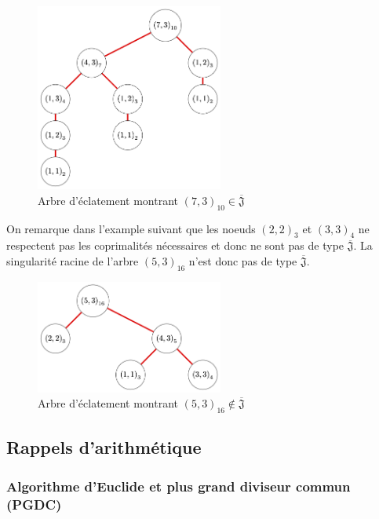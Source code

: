 \documentclass{article}
\newcommand{\J}{\mathfrak{J}}
\newcommand{\JS}{\overline{\J}}
\begin{document}
\begin{figure}[h]
    \caption{Arbre d'éclatement montrant ${(7, 3)}_{10} \in \JS$}
    \centering
    \includegraphics[width=0.55\textwidth]{10_7_3}
\end{figure}

On remarque dans l'example suivant que les noeuds ${(2, 2)}_3$ et ${(3, 3)}_4$ ne 
respectent pas les coprimalités nécessaires et donc ne sont pas de type $\JS$.
La singularité racine de l'arbre ${(5, 3)}_{16}$ n'est donc pas de type $\JS$.

\begin{figure}[h]
    \caption{Arbre d'éclatement montrant ${(5, 3)}_{16} \not \in \JS$}
    \centering
    \includegraphics[width=0.55\textwidth]{16_5_3}
\end{figure}

\newpage

\subsection{Rappels d'arithmétique}

\subsubsection{Algorithme d'Euclide et plus grand diviseur commun (PGDC)}
\end{document}
